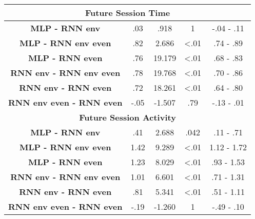 \begin{table}[h]
\begin{tabular}{ccccc}
\multicolumn{5}{c}{\textbf{Future Session Time}}                                                                     \\ \hline
\textbf{MLP - RNN env} & .03                & .918     & 1   & -.04 - .11                    \\
\textbf{MLP - RNN env even}           & .82                & 2.686     & \textless .01   & .74 - .89                     \\
\textbf{MLP - RNN even}           & .76                & 19.179     & \textless .01   & .68 - .83                     \\
\textbf{RNN env - RNN env even}           & .78                & 19.768     & \textless .01   & .70 - .86                    \\
\textbf{RNN env - RNN even}           & .72                & 18.261     & \textless .01   & .64 - .80                     \\
\textbf{RNN env even - RNN even}          & -.05                & -1.507     & .79   & -.13 - .01                    \\ \hline

\multicolumn{5}{c}{\textbf{Future Session Activity}}                                                                 \\ \hline
\textbf{MLP - RNN env} & .41                & 2.688     &  .042   & .11 - .71                     \\
\textbf{MLP - RNN env even}           & 1.42                & 9.289     & \textless .01   & 1.12 - 1.72                     \\
\textbf{MLP - RNN even}           & 1.23                & 8.029     & \textless .01   & .93 - 1.53                     \\
\textbf{RNN env - RNN env even}           & 1.01                & 6.601     & \textless .01   & .71 - 1.31                     \\
\textbf{RNN env - RNN even}           & .81               & 5.341     & \textless .01   & .51 - 1.11                     \\
\textbf{RNN env even - RNN even}          & -.19                & -1.260     &  1   & -.49 - .10                    \\ \hline


\end{tabular}
\end{table}
